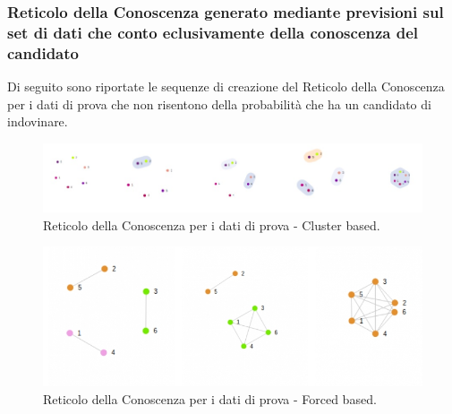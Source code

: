 \subsubsection{Reticolo della Conoscenza generato mediante previsioni sul set di dati che conto eclusivamente della conoscenza del candidato}
\label{Reticolo della Conoscenza generato mediante previsioni sul set di dati che tiene conto eclusivamente della conoscenza del candidato}

Di seguito sono riportate le sequenze di creazione del Reticolo della Conoscenza per i dati di prova che non risentono della probabilit\`a che ha un candidato di indovinare.
\noindent

\begin{figure}[H]
\centering
	\includegraphics[width=1.20\linewidth]{./image/collage_reticolo-general-cluster.png}
	\caption{Reticolo della Conoscenza per i dati di prova - Cluster based.}
	\label{Reticolo della Conoscenza per i dati di prova - Cluster based.}
\end{figure}
\noindent

\begin{figure}[H]
\centering
	\includegraphics[width=1\linewidth]{./image/collage_reticolo-general-forced.png}
	\caption{Reticolo della Conoscenza per i dati di prova - Forced based.}
	\label{Reticolo della Conoscenza per i dati di prova - Forced based.}
\end{figure}
\noindent

